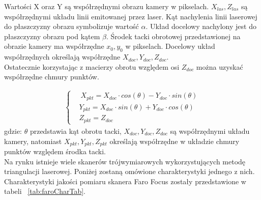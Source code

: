 Wartości X oraz Y są współrzędnymi obrazu kamery w pikselach. $X_{las},Z_{las}$ są współrzędnymi układu linii emitowanej przez laser. Kąt nachylenia linii laserowej do płaszczyzny obrazu symbolizuje wartość $\alpha$. Układ docelowy nachylony jest do płaszczyzny obrazu pod kątem $\beta$. Środek tacki obrotowej przedstawionej na obrazie kamery ma współrzędne $x_{0},y_{0}$ w pikselach. Docelowy układ współrzędnych określają współrzędne $X_{doc},Y_{doc},Z_{doc}$.\\
\indent Ostatecznie korzystając z macierzy obrotu względem osi $Z_{doc}$ można uzyskać współrzędne chmury punktów.

\begin{equation}
    \begin{aligned}
    \begin{cases}
        & \ X_{pkt}=X_{doc}\cdot cos(\theta)-Y_{doc}\cdot sin(\theta) \\
          & Y_{pkt}=X_{doc}\cdot sin(\theta)+Y_{doc}\cdot cos(\theta) \\
          & Z_{pkt}=Z_{doc}
        \end{cases}
        
        \end{aligned}
\end{equation}
gdzie: $\theta$ przedstawia kąt obrotu tacki, $X_{doc},Y_{doc},Z_{doc}$ są współrzędnymi układu kamery, natomiast $X_{pkt},Y_{pkt},Z_{pkt}$ określają współrzędne w układzie chmury punktów względem środka tacki.\\
\indent Na rynku istnieje wiele skanerów trójwymiarowych wykorzystujących metodę triangulacji laserowej. Poniżej zostaną omówione charakterystyki jednego z nich. Charakterystyki jakości pomiaru skanera Faro Focus zostały przedstawione w tabeli ~\ref{tab:faroCharTab}.


